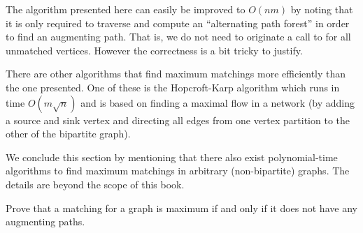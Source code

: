 %

The algorithm presented here can easily be improved to $O(nm)$ by
noting that it is only required to traverse and compute an 
``alternating path forest'' in order to find an augmenting path.  
That is, we do not need to originate a call to  for all 
unmatched vertices. However the correctness is a bit tricky to justify.

There are other algorithms that find maximum matchings more efficiently
than the one presented.  One of these is the Hopcroft-Karp algorithm
which runs in time $O(m\sqrt{n})$ and is based on finding a maximal 
flow in a network (by adding a source and sink vertex and directing all edges
from one vertex partition to the other of the bipartite graph).

We conclude this section by mentioning that there also exist
poly\-nomial-time algorithms to find maximum matchings in arbitrary
(non-bipartite) graphs. The details are beyond the scope of this book.


\begin{Exercise}\label{ex:agpath}
Prove that a matching for a graph is maximum if and only if it does not
have any augmenting paths.
\end{Exercise}

